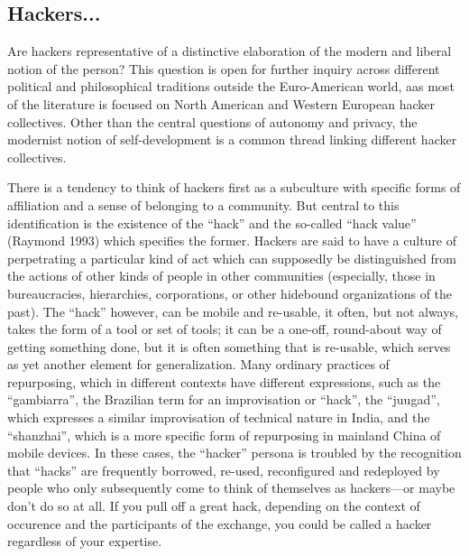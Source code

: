 \documentclass[10pt,letter,oneside]{scrartcl}
\begin{document}
\subsection{Hackers...}

Are hackers representative of a distinctive elaboration of the modern and
liberal notion of the person?  This question is open for further inquiry across
different political and philosophical traditions outside the Euro-American
world, aas most of the literature is focused on North American and Western
European hacker collectives.  Other than the central questions of autonomy and
privacy, the modernist notion of self-development is a common thread linking
different hacker collectives.

There is a tendency to think of hackers first as a subculture with specific
forms of affiliation and a sense of belonging to a community.  But central to
this identification is the existence of the ``hack'' and the so-called ``hack
value'' (Raymond 1993) which specifies the former.  Hackers are said to have a
culture of perpetrating a particular kind of act which can supposedly be
distinguished from the actions of other kinds of people in other communities
(especially, those in bureaucracies, hierarchies, corporations, or other
hidebound organizations of the past).  The ``hack'' however, can be mobile and
re-usable, it often, but not always, takes the form of a tool or set of tools;
it can be a one-off, round-about way of getting something done, but it is often
something that is re-usable, which serves as yet another element for
generalization.  Many ordinary practices of repurposing, which in different
contexts have different expressions, such as the ``gambiarra'', the Brazilian
term for an improvisation or ``hack'', the ``juugad'', which expresses a
similar improvisation of technical nature in India, and the ``shanzhai'', which
is a more specific form of repurposing in mainland China of mobile devices.  In
these cases, the ``hacker'' persona is troubled by the recognition that
``hacks'' are frequently borrowed, re-used, reconfigured and redeployed by
people who only subsequently come to think of themselves as hackers---or maybe
don’t do so at all.  If you pull off a great hack, depending on the context of
occurence and the participants of the exchange, you could be called a hacker
regardless of your expertise.
\end{document}
